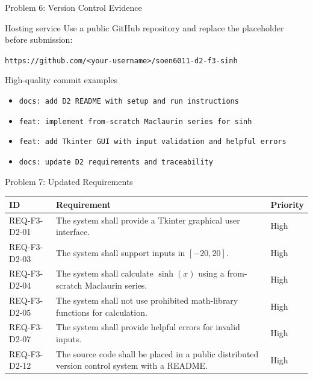\documentclass[aspectratio=169,11pt]{beamer}
\begin{document}
\begin{frame}{Problem 6: Version Control Evidence}
\begin{block}{Hosting service}
Use a public GitHub repository and replace the placeholder before submission:
\end{block}
\begin{center}
\texttt{https://github.com/<your-username>/soen6011-d2-f3-sinh}
\end{center}
\begin{block}{High-quality commit examples}
\begin{itemize}
    \item \texttt{docs: add D2 README with setup and run instructions}
    \item \texttt{feat: implement from-scratch Maclaurin series for sinh}
    \item \texttt{feat: add Tkinter GUI with input validation and helpful errors}
    \item \texttt{docs: update D2 requirements and traceability}
\end{itemize}
\end{block}
\end{frame}

\begin{frame}{Problem 7: Updated Requirements}
\small
\begin{tabular}{p{}p{}p{}}
\toprule
\textbf{ID} & \textbf{Requirement} & \textbf{Priority} \\
\midrule
REQ-F3-D2-01 & The system shall provide a Tkinter graphical user interface. & High \\
REQ-F3-D2-03 & The system shall support inputs in $[-20,20]$. & High \\
REQ-F3-D2-04 & The system shall calculate $\sinh(x)$ using a from-scratch Maclaurin series. & High \\
REQ-F3-D2-05 & The system shall not use prohibited math-library functions for calculation. & High \\
REQ-F3-D2-07 & The system shall provide helpful errors for invalid inputs. & High \\
REQ-F3-D2-12 & The source code shall be placed in a public distributed version control system with a README. & High \\
\bottomrule
\end{tabular}
\end{frame}
\end{document}
